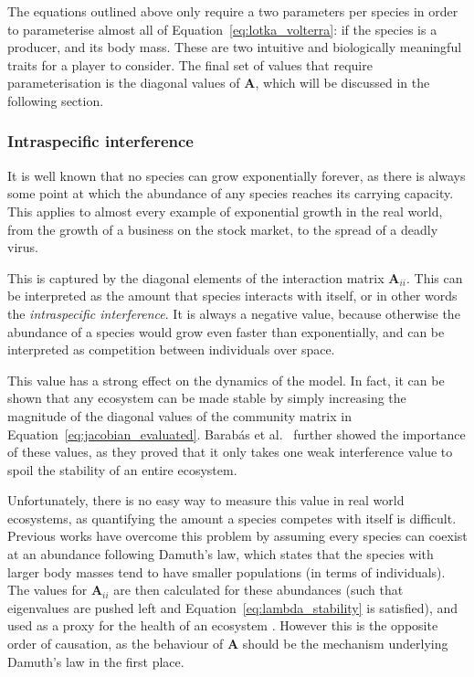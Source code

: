 The equations outlined above only require a two parameters per species in order to parameterise almost all of Equation~\eqref{eq:lotka_volterra}: if the species is a producer, and its body mass. These are two intuitive and biologically meaningful traits for a player to consider.
The final set of values that require parameterisation is the diagonal values of $\mathbf{A}$, which will be discussed in the following section.

\subsubsection{Intraspecific interference}
It is well known that no species can grow exponentially forever, as there is always some point at which the abundance of any species reaches its carrying capacity. 
This applies to almost every example of exponential growth in the real world, from the growth of a business on the stock market, to the spread of a deadly virus.

This is captured by the diagonal elements of the interaction matrix $\mathbf{A}_{ii}$. This can be interpreted as the amount that species interacts with itself, or in other words the \emph{intraspecific interference}. It is always a negative value, because otherwise the abundance of a species would grow even faster than exponentially, and can be interpreted as competition between individuals over space.

This value has a strong effect on the dynamics of the model. In fact, it can be shown that any ecosystem can be made stable by simply increasing the magnitude of the diagonal values of the community matrix in Equation~\eqref{eq:jacobian_evaluated}. 
Barab\'as et al.\ \cite{Barabas2017} further showed the importance of these values, as they proved that it only takes one weak interference value to spoil the stability of an entire ecosystem.

Unfortunately, there is no easy way to measure this value in real world ecosystems, as quantifying the amount a species competes with itself is difficult. Previous works have overcome this problem by assuming every species can coexist at an abundance following Damuth's law, which states that the species with larger body masses tend to have smaller populations (in terms of individuals). The values for $\mathbf{A}_{ii}$ are then calculated for these abundances (such that eigenvalues are pushed left and Equation~\eqref{eq:lambda_stability} is satisfied), and used as a proxy for the health of an ecosystem \cite{Tang2014Correlation, Pawar2015}. However this is the opposite order of causation, as the behaviour of $\mathbf{A}$ should be the mechanism underlying Damuth's law in the first place.

